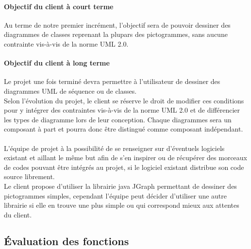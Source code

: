 \documentclass[12pt,a4paper,openany]{article}
\begin{document}
	\paragraph{Objectif du client à court terme} Au terme de notre premier incrément, l'objectif sera
	de pouvoir dessiner des diagrammes de classes reprenant la plupars des pictogrammes, sans aucune
	contrainte vis-à-vis de la norme UML 2.0.
	\paragraph{Objectif du client à long terme}
	Le projet une fois terminé devra permettre à l'utilisateur de dessiner des diagrammes UML de séquence ou de classes.\\
	Selon l'évolution du projet, le client se réserve le droit de modifier ces conditions pour y
	intégrer des contraintes vis-à-vis de la norme UML 2.0 et de différencier les types de diagramme lors de leur conception. 
	Chaque diagrammes sera un composant à part et pourra donc être distingué comme composant indépendant.
	\paragraph{} L'équipe de projet à la possibilité de se renseigner sur d'éventuels logiciels
	existant et aillant le même but afin de s'en inspirer ou de récupérer des morceaux de codes pouvant être intégrés au projet, si le logiciel existant distribue son code source librement. \\
	Le client propose d'utiliser la librairie java JGraph permettant de dessiner des pictogrammes simples, cependant l'équipe peut décider
	d'utiliser une autre librairie si elle en trouve une plus simple ou qui correspond mieux aux attentes du client.
	\subsection{Évaluation des fonctions}
\end{document}
